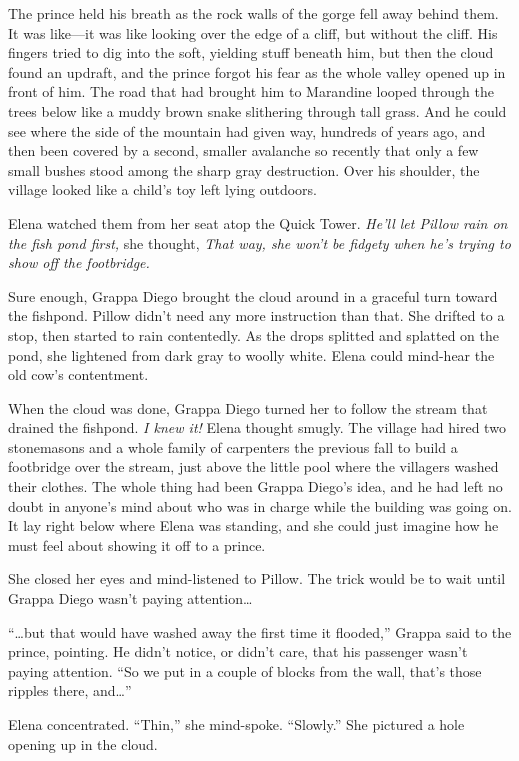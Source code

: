 \documentclass[10pt]{book}
\begin{document}
The prince held his breath as the rock walls of the gorge fell away behind them. It was like---it was like looking over the edge of a cliff, but without the cliff. His fingers tried to dig into the soft, yielding stuff beneath him, but then the cloud found an updraft, and the prince forgot his fear as the whole valley opened up in front of him. The road that had brought him to Marandine looped through the trees below like a muddy brown snake slithering through tall grass. And he could see where the side of the mountain had given way, hundreds of years ago, and then been covered by a second, smaller avalanche so recently that only a few small bushes stood among the sharp gray destruction. Over his shoulder, the village looked like a child's toy left lying outdoors.

Elena watched them from her seat atop the Quick Tower. \emph{He'll let Pillow rain on the fish pond first,} she thought, \emph{That way, she won't be fidgety when he's trying to show off the footbridge.}

Sure enough, Grappa Diego brought the cloud around in a graceful turn toward the fishpond. Pillow didn't need any more instruction than that. She drifted to a stop, then started to rain contentedly. As the drops splitted and splatted on the pond, she lightened from dark gray to woolly white. Elena could mind-hear the old cow's contentment.

When the cloud was done, Grappa Diego turned her to follow the stream that drained the fishpond. \emph{I knew it!} Elena thought smugly. The village had hired two stonemasons and a whole family of carpenters the previous fall to build a footbridge over the stream, just above the little pool where the villagers washed their clothes. The whole thing had been Grappa Diego's idea, and he had left no doubt in anyone's mind about who was in charge while the building was going on. It lay right below where Elena was standing, and she could just imagine how he must feel about showing it off to a prince.

She closed her eyes and mind-listened to Pillow. The trick would be to wait until Grappa Diego wasn't paying attention{\ldots}

``{\ldots}but that would have washed away the first time it flooded,'' Grappa said to the prince, pointing. He didn't notice, or didn't care, that his passenger wasn't paying attention. ``So we put in a couple of blocks from the wall, that's those ripples there, and{\ldots}''

Elena concentrated. ``Thin,'' she mind-spoke. ``Slowly.'' She pictured a hole opening up in the cloud.
\end{document}
